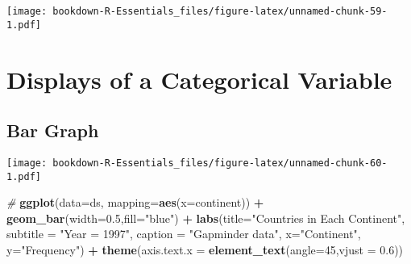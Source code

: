 \documentclass[
]{book}
\newenvironment{Shaded}{\begin{snugshade}}{\end{snugshade}}
\newcommand{\CommentTok}[1]{\textcolor[rgb]{0.56,0.35,0.01}{\textit{#1}}}
\newcommand{\DataTypeTok}[1]{\textcolor[rgb]{0.13,0.29,0.53}{#1}}
\newcommand{\DecValTok}[1]{\textcolor[rgb]{0.00,0.00,0.81}{#1}}
\newcommand{\FloatTok}[1]{\textcolor[rgb]{0.00,0.00,0.81}{#1}}
\newcommand{\KeywordTok}[1]{\textcolor[rgb]{0.13,0.29,0.53}{\textbf{#1}}}
\newcommand{\NormalTok}[1]{#1}
\newcommand{\OperatorTok}[1]{\textcolor[rgb]{0.81,0.36,0.00}{\textbf{#1}}}
\newcommand{\StringTok}[1]{\textcolor[rgb]{0.31,0.60,0.02}{#1}}
\begin{document}
\texttt{[image: bookdown-R-Essentials\_files/figure-latex/unnamed-chunk-59-1.pdf]}

\hypertarget{displays-of-a-categorical-variable}{%
\section{Displays of a Categorical Variable}\label{displays-of-a-categorical-variable}}

\hypertarget{bar-graph}{%
\subsection{Bar Graph}\label{bar-graph}}

\begin{Shaded}
\end{Shaded}

\texttt{[image: bookdown-R-Essentials\_files/figure-latex/unnamed-chunk-60-1.pdf]}

\begin{Shaded}
\begin{Highlighting}[]
\CommentTok{#}
\KeywordTok{ggplot}\NormalTok{(}\DataTypeTok{data=}\NormalTok{ds, }\DataTypeTok{mapping=}\KeywordTok{aes}\NormalTok{(}\DataTypeTok{x=}\NormalTok{continent)) }\OperatorTok{+}\StringTok{ }
\StringTok{  }\KeywordTok{geom_bar}\NormalTok{(}\DataTypeTok{width=}\FloatTok{0.5}\NormalTok{,}\DataTypeTok{fill=}\StringTok{"blue"}\NormalTok{) }\OperatorTok{+}
\StringTok{  }\KeywordTok{labs}\NormalTok{(}\DataTypeTok{title=}\StringTok{"Countries in Each Continent"}\NormalTok{,}
       \DataTypeTok{subtitle =} \StringTok{"Year = 1997"}\NormalTok{,}
       \DataTypeTok{caption =} \StringTok{"Gapminder data"}\NormalTok{,}
       \DataTypeTok{x=}\StringTok{"Continent"}\NormalTok{, }
       \DataTypeTok{y=}\StringTok{"Frequency"}\NormalTok{) }\OperatorTok{+}
\StringTok{  }\KeywordTok{theme}\NormalTok{(}\DataTypeTok{axis.text.x =} \KeywordTok{element_text}\NormalTok{(}\DataTypeTok{angle=}\DecValTok{45}\NormalTok{,}\DataTypeTok{vjust =} \FloatTok{0.6}\NormalTok{))}
\end{Highlighting}
\end{Shaded}
\end{document}
